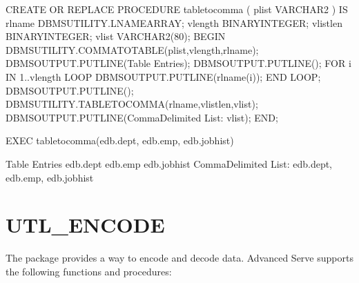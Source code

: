 \documentclass[letterpaper,10pt,english,openany,oneside]{sphinxmanual}
\begin{document}
%
\begin{sphinxVerbatim}[commandchars=\\\{\}]
CREATE OR REPLACE PROCEDURE table\PYGZus{}to\PYGZus{}comma (
    p\PYGZus{}list      VARCHAR2
)
IS
    r\PYGZus{}lname     DBMS\PYGZus{}UTILITY.LNAME\PYGZus{}ARRAY;
    v\PYGZus{}length    BINARY\PYGZus{}INTEGER;
    v\PYGZus{}listlen   BINARY\PYGZus{}INTEGER;
    v\PYGZus{}list      VARCHAR2(80);
BEGIN
    DBMS\PYGZus{}UTILITY.COMMA\PYGZus{}TO\PYGZus{}TABLE(p\PYGZus{}list,v\PYGZus{}length,r\PYGZus{}lname);
    DBMS\PYGZus{}OUTPUT.PUT\PYGZus{}LINE(\PYGZsq{}Table Entries\PYGZsq{});
    DBMS\PYGZus{}OUTPUT.PUT\PYGZus{}LINE(\PYGZsq{}\PYGZhy{}\PYGZhy{}\PYGZhy{}\PYGZhy{}\PYGZhy{}\PYGZhy{}\PYGZhy{}\PYGZhy{}\PYGZhy{}\PYGZhy{}\PYGZhy{}\PYGZhy{}\PYGZhy{}\PYGZsq{});
    FOR i IN 1..v\PYGZus{}length LOOP
        DBMS\PYGZus{}OUTPUT.PUT\PYGZus{}LINE(r\PYGZus{}lname(i));
    END LOOP;
    DBMS\PYGZus{}OUTPUT.PUT\PYGZus{}LINE(\PYGZsq{}\PYGZhy{}\PYGZhy{}\PYGZhy{}\PYGZhy{}\PYGZhy{}\PYGZhy{}\PYGZhy{}\PYGZhy{}\PYGZhy{}\PYGZhy{}\PYGZhy{}\PYGZhy{}\PYGZhy{}\PYGZsq{});
    DBMS\PYGZus{}UTILITY.TABLE\PYGZus{}TO\PYGZus{}COMMA(r\PYGZus{}lname,v\PYGZus{}listlen,v\PYGZus{}list);
    DBMS\PYGZus{}OUTPUT.PUT\PYGZus{}LINE(\PYGZsq{}Comma\PYGZhy{}Delimited List: \PYGZsq{} \textbar{}\textbar{} v\PYGZus{}list);
END;

EXEC table\PYGZus{}to\PYGZus{}comma(\PYGZsq{}edb.dept, edb.emp, edb.jobhist\PYGZsq{})

Table Entries
\PYGZhy{}\PYGZhy{}\PYGZhy{}\PYGZhy{}\PYGZhy{}\PYGZhy{}\PYGZhy{}\PYGZhy{}\PYGZhy{}\PYGZhy{}\PYGZhy{}\PYGZhy{}\PYGZhy{}
edb.dept
edb.emp
edb.jobhist
\PYGZhy{}\PYGZhy{}\PYGZhy{}\PYGZhy{}\PYGZhy{}\PYGZhy{}\PYGZhy{}\PYGZhy{}\PYGZhy{}\PYGZhy{}\PYGZhy{}\PYGZhy{}\PYGZhy{}
Comma\PYGZhy{}Delimited List: edb.dept, edb.emp, edb.jobhist
\end{sphinxVerbatim}

\newpage


\section{UTL\_ENCODE}
\label{\detokenize{utl_encode::doc}}\label{\detokenize{utl_encode:utl-encode}}
The  package provides a way to encode and decode data.
Advanced Serve supports the following functions and procedures:
\end{document}
